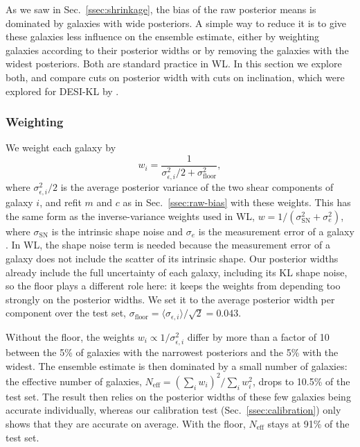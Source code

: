 As we saw in Sec.~\ref{ssec:shrinkage}, the bias of the raw posterior means is dominated by galaxies with wide posteriors. A simple way to reduce it is to give these galaxies less influence on the ensemble estimate, either by weighting galaxies according to their posterior widths or by removing the galaxies with the widest posteriors. Both are standard practice in WL. In this section we explore both, and compare cuts on posterior width with cuts on inclination, which were explored for DESI-KL by \citep{KLDESI}.

\subsubsection{Weighting}

We weight each galaxy by
\begin{equation}
\label{eqn:weights}
    w_i = \frac{1}{\sigma_{\epsilon,i}^2/2 + \sigma_\mathrm{floor}^2},
\end{equation}
where $\sigma_{\epsilon,i}^2/2$ is the average posterior variance of the two shear components of galaxy $i$, and refit $m$ and $c$ as in Sec.~\ref{ssec:raw-bias} with these weights. This has the same form as the inverse-variance weights used in WL, $w = 1/(\sigma_\mathrm{SN}^2 + \sigma_e^2)$, where $\sigma_\mathrm{SN}$ is the intrinsic shape noise and $\sigma_e$ is the measurement error of a galaxy \citep{HSCY1Shape}. In WL, the shape noise term is needed because the measurement error of a galaxy does not include the scatter of its intrinsic shape. Our posterior widths already include the full uncertainty of each galaxy, including its KL shape noise, so the floor plays a different role here: it keeps the weights from depending too strongly on the posterior widths. We set it to the average posterior width per component over the test set, $\sigma_\mathrm{floor} = \langle\sigma_{\epsilon,i}\rangle/\sqrt{2} = 0.043$.

Without the floor, the weights $w_i \propto 1/\sigma_{\epsilon,i}^2$ differ by more than a factor of 10 between the 5\% of galaxies with the narrowest posteriors and the 5\% with the widest. The ensemble estimate is then dominated by a small number of galaxies: the effective number of galaxies, $N_\mathrm{eff} = (\sum_i w_i)^2/\sum_i w_i^2$, drops to 10.5\% of the test set. The result then relies on the posterior widths of these few galaxies being accurate individually, whereas our calibration test (Sec.~\ref{ssec:calibration}) only shows that they are accurate on average. With the floor, $N_\mathrm{eff}$ stays at 91\% of the test set.

